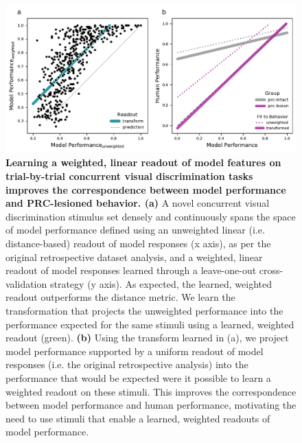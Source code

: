 \documentclass[11pt]{article}
\begin{document}
\begin{figure}[ht]
\centering
\includegraphics[width=\linewidth]{figures/weighted_unweighted_transform}
\caption{\textbf{ Learning a weighted, linear readout of model features on trial-by-trial concurrent visual discrimination tasks improves the correspondence between model performance and PRC-lesioned behavior. (a)} A novel concurrent visual discrimination stimulus set densely and continuously spans the space of model performance defined using an unweighted linear (i.e. distance-based) readout of model responses (x axis), as per the original retrospective dataset analysis, and a weighted, linear readout of model responses learned through a leave-one-out cross-validation strategy (y axis). As expected, the learned, weighted readout outperforms the distance metric. We learn the transformation that projects the unweighted performance into the performance expected for the same stimuli using a learned, weighted readout (green). \textbf{(b)} Using the transform learned in (a), we project model performance supported by a uniform readout of model responses (i.e. the original retrospective analysis) into the performance that would be expected were it possible to learn a weighted readout on these stimuli. This improves the correspondence between model performance and human performance, motivating the need to use stimuli that enable a learned, weighted readouts of model performance.}
\label{fig:compare_readouts}
\end{figure}
\end{document}
